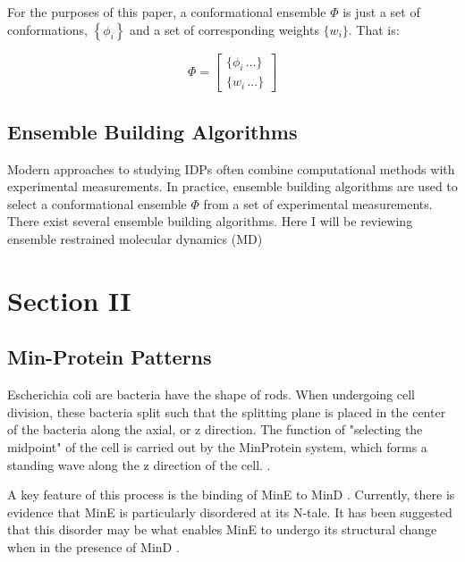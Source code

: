 \documentclass{article}
\begin{document}
For the purposes of this paper, a conformational ensemble $\Phi$ is just a set of conformations, $\left \{ \phi_i \right \}$ and a set of corresponding weights $\{ w_i \}$. That is:

\begin{equation} \label{eq:conformational_ensemble}
    \Phi = \begin{bmatrix}
        \{ \phi_i \, ... \} \\
        \{ w_i \, ...\}
    \end{bmatrix}
\end{equation}



\subsection{Ensemble Building Algorithms}

Modern approaches to studying IDPs often combine computational methods with experimental measurements. In practice, ensemble building algorithms are used to select a conformational ensemble $\Phi$ from a set of experimental measurements. There exist several ensemble building algorithms. Here I will be reviewing ensemble restrained molecular dynamics (MD)

\section{Section II}

\subsection{Min-Protein Patterns}

Escherichia coli are bacteria have the shape of rods. When undergoing cell division, these bacteria split such that the splitting plane is placed in the center of the bacteria along the axial, or z direction. The function of "selecting the midpoint" of the cell is carried out by the MinProtein system, which forms a standing wave along the z direction of the cell. \cite{lutkenhaus_assembly_2007}\cite{raskin_rapid_1999}\cite{hu_topological_1999}.

A key feature of this process is the binding of MinE to MinD \cite{loose_protein_2011}. Currently, there is evidence that MinE is particularly disordered at its N-tale. It has been suggested that this disorder may be what enables MinE to undergo its structural change when in the presence of MinD \cite{uversky_unusual_2013}. 
\end{document}
